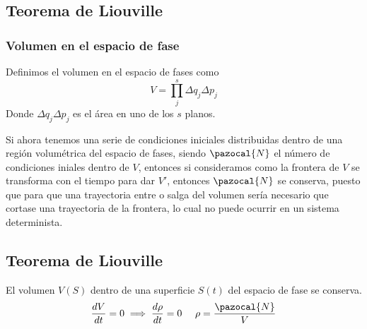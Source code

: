 \subsection{Teorema de Liouville} 
\subsubsection{Volumen en el espacio de fase}
Definimos el volumen en el espacio de fases como
\begin{equation} \label{4.4.1}
    V = \prod_j^s \Delta q_j \Delta p_j
\end{equation} 
Donde $\Delta q_j \Delta p_j$ es el área en uno de los $s$ planos.

Si ahora tenemos una serie de condiciones iniciales distribuidas dentro de una región volumétrica del espacio de fases, siendo $\pazocal{N}$ el número de condiciones iniales dentro de $V$, entonces si consideramos como la frontera de $V$ se transforma con el tiempo para dar $V'$, entonces $\pazocal{N}$ se conserva, puesto que para que una trayectoria entre o salga del volumen sería necesario que cortase una trayectoria de la frontera, lo cual no puede ocurrir en un sistema determinista.
\subsection{Teorema de Liouville} 
El volumen $V(S)$ dentro de una superficie $S(t)$ del espacio de fase se conserva.
\begin{equation} \label{4.4.2}
    \frac{dV}{dt}=0 \implies \frac{d\rho}{dt} = 0 \ \ \ \ \rho = \frac{\pazocal{N}}{V}
\end{equation} 
\vspace{-40pt}
